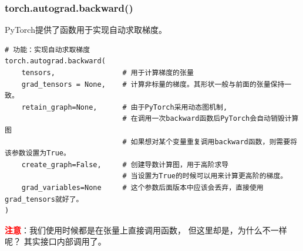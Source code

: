\subsubsection{torch.autograd.backward()}
\label{subsubsec:Pytorch的torch.autograd.backward()}
PyTorch提供了函数用于实现自动求取梯度。

\begin{lstlisting}[style=demostyle, numbers=none]
# 功能：实现自动求取梯度
torch.autograd.backward(
    tensors,                # 用于计算梯度的张量
    grad_tensors = None,    # 计算非标量的梯度。其形状一般与前面的张量保持一致。
    retain_graph=None,      # 由于PyTorch采用动态图机制,
                            # 在调用一次backward函数后PyTorch会自动销毁计算图
                            # 如果想对某个变量重复调用backward函数，则需要将该参数设置为True。
    create_graph=False,     # 创建导数计算图，用于高阶求导
                            # 当设置为True的时候可以用来计算更高阶的梯度。
    grad_variables=None     # 这个参数后面版本中应该会丢弃，直接使用grad_tensors就好了。
)  
\end{lstlisting}

\textcolor{red}{\textbf{注意}}：我们使用时候都是在张量上直接调用函数，
但这里却是，为什么不一样呢？ 
其实接口内部调用了。

